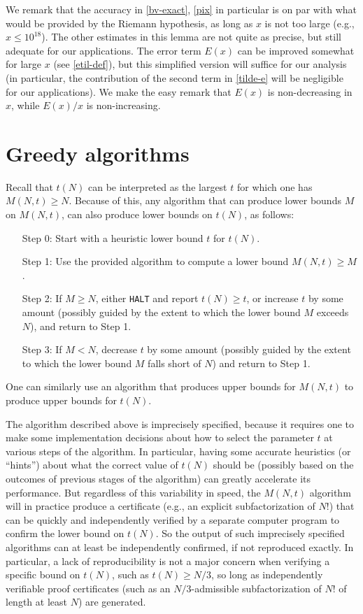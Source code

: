 \documentclass[12pt,a4paper,reqno]{amsart}
\numberwithin{equation}{section}
\theoremstyle{plain}
\theoremstyle{definition}
\begin{document}
We remark that the accuracy in \eqref{bv-exact}, \eqref{pix} in particular is on par with what would be provided by the Riemann hypothesis, as long as $x$ is not too large (e.g., $x \leq 10^{18}$).  The other estimates in this lemma are not quite as precise, but still adequate for our applications.  The error term $E(x)$ can be improved somewhat for large $x$ (see \eqref{etil-def}), but this simplified version will suffice for our analysis (in particular, the contribution of the second term in \eqref{tilde-e} will be negligible for our applications).  We make the easy remark that $E(x)$ is non-decreasing in $x$, while $E(x)/x$ is non-increasing.

\section{Greedy algorithms}\label{greedy-sec}

Recall that $t(N)$ can be interpreted as the largest $t$ for which one has $M(N,t) \geq N$. Because of this, any algorithm that can produce lower bounds $M$ on $M(N,t)$, can also produce lower bounds on $t(N)$, as follows:

\begin{itemize}
\setlength{\itemsep}{2pt}
  \item[Step 0:] Start with a heuristic lower bound $t$ for $t(N)$.
  \item[Step 1:] Use the provided algorithm to compute a lower bound $M(N,t)\ge M$.
  \item[Step 2:] If $M \ge N$, either \texttt{HALT} and report $t(N)\ge t$, or increase $t$ by some amount (possibly guided by the extent to which the lower bound $M$ exceeds $N$), and return to Step 1.
  \item[Step 3:] If $M < N$, decrease $t$ by some amount (possibly guided by the extent to which the lower bound $M$ falls short of $N$) and return to Step 1.
\end{itemize}

One can similarly use an algorithm that produces upper bounds for $M(N,t)$ to produce upper bounds for $t(N)$.

The algorithm described above is imprecisely specified, because it requires one to make some implementation decisions about how to select the parameter $t$ at various steps of the algorithm. In particular, having some accurate heuristics (or ``hints'') about what the correct value of $t(N)$ should be (possibly based on the outcomes of previous stages of the algorithm) can greatly accelerate its performance.  But regardless of this variability in speed, the $M(N,t)$ algorithm will in practice produce a certificate (e.g., an explicit subfactorization of $N!$) that can be quickly and independently verified by a separate computer program to confirm the lower bound on $t(N)$.  So the output of such imprecisely specified algorithms can at least be independently confirmed, if not reproduced exactly.  In particular, a lack of reproducibility is not a major concern when verifying a specific bound on $t(N)$, such as $t(N) \geq N/3$, so long as independently verifiable proof certificates (such as an $N/3$-admissible subfactorization of $N!$ of length at least $N$) are generated.
\end{document}
